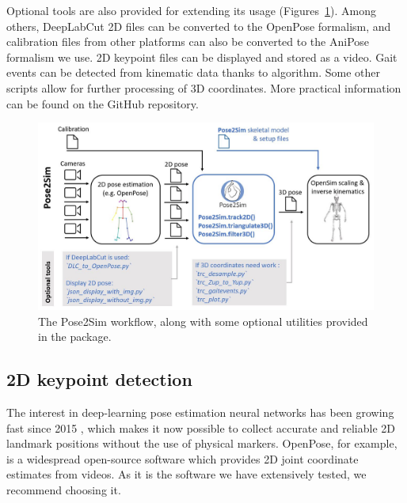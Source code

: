 Optional tools are also provided for extending its usage (Figures~\ref{fig_opensimutilities}). Among others, DeepLabCut 2D files can be converted to the OpenPose formalism, and calibration files from other platforms can also be converted to the AniPose \cite{Karashchuk2021} formalism we use. 2D keypoint files can be displayed and stored as a video. Gait events can be detected from kinematic data thanks to \cite{Zeni2008} algorithm. Some other scripts allow for further processing of 3D coordinates. More practical information can be found on the GitHub repository. 

\begin{figure}[hbtp]
	\centering
	\def\svgwidth{1\columnwidth}
	\fontsize{10pt}{10pt}\selectfont
	\includegraphics[width=\linewidth]{"../Chap3/Figures/Fig_Pose2SimUtilities.jpg"}
	\caption{The Pose2Sim workflow, along with some optional utilities provided in the package.}
	\label{fig_opensimutilities}
\end{figure}


\subsection{2D keypoint detection}

The interest in deep-learning pose estimation neural networks has been growing fast since 2015 \cite{Zheng2022}, which makes it now possible to collect accurate and reliable 2D landmark positions without the use of physical markers. OpenPose, for example, is a widespread open-source software which provides 2D joint coordinate estimates from videos. As it is the software we have extensively tested, we recommend choosing it.

